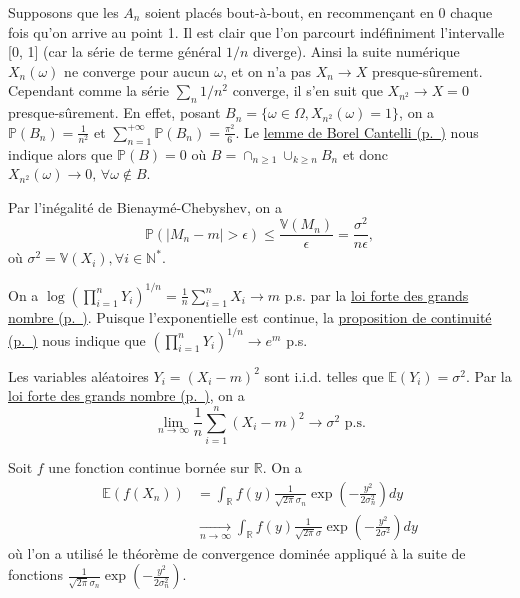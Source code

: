 \label{IV-answer-ia2}
Supposons que les \(A_n\) soient placés bout-à-bout, en recommençant en
0 chaque fois qu'on arrive au point 1. Il est clair que l'on parcourt
indéfiniment l'intervalle {[}0, 1{]} (car la série de terme général
\(1/n\) diverge). Ainsi la suite numérique \(X_n (\omega)\) ne converge
pour aucun \(\omega\), et on n'a pas \(X_n \to X\) presque-sûrement.
Cependant comme la série \(\sum_n 1/n^2\) converge, il s'en suit que
\(X_{n^2} \to X = 0\) presque-sûrement. En effet, posant
\(B_n =\{\omega \in \Omega, X_{n^2}(\omega)=1\}\), on a
\(\mathbb{P}(B_n) = \frac{1}{n^2}\) et
\(\sum_{n=1}^{+\infty} \mathbb{P}(B_n) = \frac{\pi^2}{6}\). Le
\protect\hyperref[IV-BC]{lemme de Borel Cantelli (p.~\pageref*{IV-BC})}
nous indique alors que \(\mathbb{P}(B) = 0\) où
\(B = \cap_{n\geq 1}\cup_{k\geq n} B_n\) et donc
\(X_{n^2}(\omega) \to 0,\, \forall \omega \notin B\).

\label{IV-answer-wlln}
Par l'inégalité de Bienaymé-Chebyshev, on a
\[\mathbb{P}(|M_n-m| > \epsilon) \leq \frac{\mathbb{V}(M_n)}{\epsilon} = \frac{\sigma^2}{n\epsilon},\]
où \(\sigma^2 = \mathbb{V}(X_i), \forall i \in \mathbb{N}^\ast\).

\label{IV-answer-expo}
On a
\(\log\left(\prod_{i=1}^n Y_i\right)^{1/n} = \frac{1}{n}\sum_{i=1}^n X_i \to m\)
p.s. par la \protect\hyperref[IV-lfgn]{loi forte des grands
nombre (p.~\pageref*{IV-lfgn})}. Puisque l'exponentielle est continue,
la \protect\hyperref[IV-propconv4]{proposition de
continuité (p.~\pageref*{IV-propconv4})} nous indique que
\(\left(\prod_{i=1}^n Y_i\right)^{1/n} \to e^m\) p.s.

\label{IV-answer-variance}
Les variables aléatoires \(Y_i = (X_i - m)^2\) sont i.i.d. telles que
\(\mathbb{E}(Y_i)= \sigma^2\). Par la \protect\hyperref[IV-lfgn]{loi
forte des grands nombre (p.~\pageref*{IV-lfgn})}, on a
\[\lim_{n \to \infty} \frac{1}{n} \sum_{i=1}^n (X_i - m)^2 \to \sigma^2  \text{   p.s.}\]

\label{IV-answer-suitegauss}
Soit \(f\) une fonction continue bornée sur \(\mathbb{R}\). On a
\begin{align*}
\mathbb{E}(f(X_n)) &= \int_\mathbb{R}f(y) \frac{1}{\sqrt{2\pi}\sigma_n} \exp\left(-\frac{y^2}{2\sigma^2_n}\right) dy \\
             &\xrightarrow[n \to \infty]{} \int_\mathbb{R}f(y) \frac{1}{\sqrt{2\pi}\sigma} \exp\left(-\frac{y^2}{2\sigma^2}\right) dy
\end{align*} où l'on a utilisé le théorème de convergence dominée
appliqué à la suite de fonctions
\(\frac{1}{\sqrt{2\pi}\sigma_n} \exp\left(-\frac{y^2}{2\sigma^2_n}\right)\).


